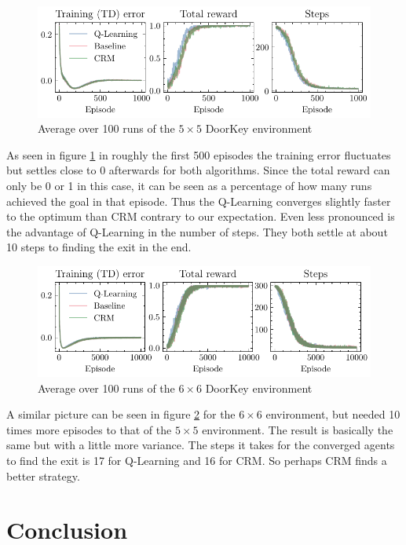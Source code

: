 \documentclass[12pt, a4paper]{article}
\begin{document}
\begin{figure}[ht!]
	\centering
	\includegraphics[width=\textwidth]{figures/fig_100runs_5x5.pdf}
	\caption{Average over 100 runs of the $5 \times 5$ DoorKey environment}
	\label{fig:5x5}
\end{figure}

As seen in figure \ref{fig:5x5} in roughly the first 500 episodes the training error fluctuates but settles close to 0 afterwards for both algorithms. Since the total reward can only be 0 or 1 in this case, it can be seen as a percentage of how many runs achieved the goal in that episode. Thus the Q-Learning converges slightly faster to the optimum than CRM contrary to our expectation. Even less pronounced is the advantage of Q-Learning in the number of steps. They both settle at about 10 steps to finding the exit in the end.

\begin{figure}[ht!]
	\centering
	\includegraphics[width=\textwidth]{figures/fig_100runs_6x6.pdf}
	\caption{Average over 100 runs of the $6 \times 6$ DoorKey environment}
	\label{fig:6x6}
\end{figure}

A similar picture can be seen in figure \ref{fig:6x6} for the $6 \times 6$ environment, but needed 10 times more episodes to that of the $5 \times 5$ environment. The result is basically the same but with a little more variance. The steps it takes for the converged agents to find the exit is 17 for Q-Learning and 16 for CRM. So perhaps CRM finds a better strategy.

\section*{Conclusion}
\end{document}
